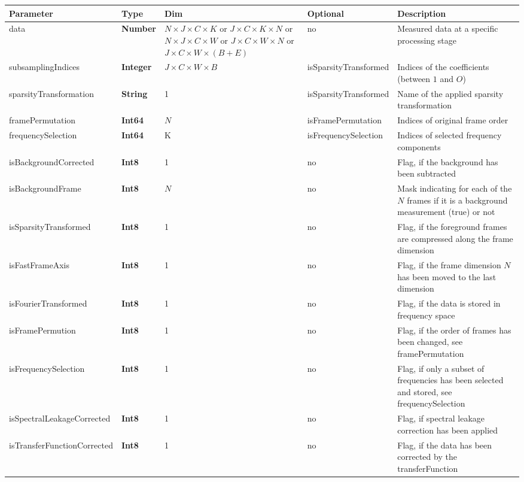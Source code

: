 \documentclass[landscape,a4paper]{article} %
\newcommand{\inltab}[1]{{\ttfamily\bfseries\color{blue}#1}}
\newcommand{\inlvar}[1]{{\ttfamily#1}}
\begin{document}
\noindent \begin{tabularx}{\columnwidth}{llp{3cm}lX} 
\textbf{Parameter} & \textbf{Type} & \textbf{Dim} &  \textbf{Optional} & \textbf{Description} \\ \hline 
\inlvar{data} & \inltab{Number} & $N \times J \times C \times K$ or $ J \times C \times K\times N$ or $N \times J \times C \times W$ or $ J \times C \times W \times N$ or $J \times C \times W \times (B+E)$ & no & Measured data at a specific processing stage \\ \hline
\inlvar{subsamplingIndices} & \inltab{Integer} & $ J \times C \times W \times B$ & \inlvar{isSparsityTransformed} & Indices of the coefficients (between $1$ and $O$)\\ \hline
\inlvar{sparsityTransformation} & \inltab{String} & 1 & \inlvar{isSparsityTransformed} & Name of the applied sparsity transformation\\ \hline
\inlvar{framePermutation} & \inltab{Int64} & $N$ & \inlvar{isFramePermutation} & Indices of original frame order\\ \hline
\inlvar{frequencySelection} & \inltab{Int64} & K & \inlvar{isFrequencySelection} & Indices of selected frequency components \\ \hline
\inlvar{isBackgroundCorrected} & \inltab{Int8} & 1 & no & Flag, if the background has been subtracted \\ \hline
\inlvar{isBackgroundFrame} & \inltab{Int8} & $N$ & no & Mask indicating for each of the $N$ frames if it is a background measurement (true) or not \\ \hline
\inlvar{isSparsityTransformed} & \inltab{Int8} & 1 & no & Flag, if the foreground frames are compressed along the frame dimension \\ \hline
\inlvar{isFastFrameAxis} & \inltab{Int8} & 1 & no & Flag, if the frame dimension $N$ has been moved to the last dimension\\ \hline
\inlvar{isFourierTransformed} & \inltab{Int8} & 1 & no & Flag, if the data is stored in frequency space \\ \hline
\inlvar{isFramePermution} & \inltab{Int8} & 1 & no & Flag, if the order of frames has been changed, see \inlvar{framePermutation} \\ \hline 
\inlvar{isFrequencySelection} & \inltab{Int8} & 1 & no & Flag, if only a subset of frequencies has been selected and stored, see \inlvar{frequencySelection}\\ \hline 
\inlvar{isSpectralLeakageCorrected} & \inltab{Int8} & 1 & no & Flag, if spectral leakage correction has been applied \\ \hline
\inlvar{isTransferFunctionCorrected} & \inltab{Int8} & 1 & no & Flag, if the data has been corrected by the \inlvar{transferFunction}\\ \hline 
\end{tabularx} 
\end{document}
